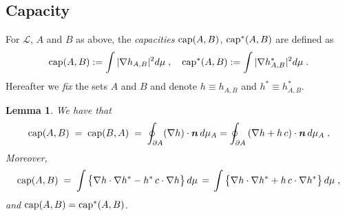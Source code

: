 \documentclass[reqno]{amsart}
\newtheorem{lemma}[theorem]{Lemma}
\newcounter{as}[section]
\newcommand{\mc}[1]{{\mathcal #1}}
\newcommand{\bs}[1]{{\boldsymbol #1}}
\newcommand{\<}{\langle}
\renewcommand{\>}{\rangle}
\renewcommand{\Cap}{{\rm cap}}
\begin{document}
\subsection{Capacity}
For $\mc L$, $A$ and $B$ as above, the \emph{capacities} $\Cap(A,B)$,
$\Cap^*(A,B)$ are defined as
\begin{equation}
\label{e:cap}
\Cap(A,B) := \int |\nabla h_{A,B}|^2 d\mu \;, \quad
\Cap^*(A,B) := \int |\nabla h^*_{A,B}|^2 d\mu \;.
\end{equation}
Hereafter we \emph{fix} the sets $A$ and $B$ and denote $h\equiv
h_{A,B}$ and $h^*\equiv h^*_{A,B}$.
\begin{lemma}
\label{e:capeq}
We have that
\begin{equation*}
\Cap(A,B) \;= \; \Cap(B,A) \;=\;
\oint_{\partial A} (\nabla h)\cdot \bs n \,d\mu_A
=\oint_{\partial A} \left(\nabla h + h\, c\right)\cdot \bs n
\,d\mu_A \;.
\end{equation*}
Moreover,
\begin{equation}
\label{ma1}
\Cap(A,B) \;= \;
\int \big\{ \nabla h \cdot \nabla h^*- h^* \,c\cdot \nabla
h\big\} \, d\mu
\, =\, \int \big\{ \nabla h \cdot \nabla h^*+ h \,c\cdot \nabla h^*
\big\} \, d\mu\;,
\end{equation}
and $\Cap(A,B)=\Cap^*(A,B)$.
\end{lemma}
\end{document}
